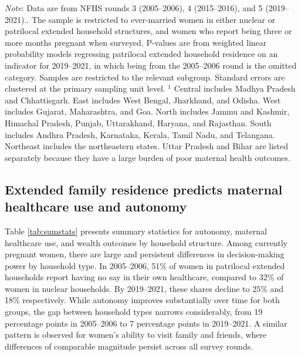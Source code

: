 \documentclass[10pt,twoside,reqno]{article}
\begin{document}
\begin{table}[H]
\sansmath
\sffamily
\captionsetup{style=CAPFIG}
\caption{Proportion of pregnant women in patrilocal extended households is increasing among nearly all subgroups}
\label{tab:patrilocal_subgroups}
\vspace{-4pt}

\begin{scriptsize}
\setlength{\tabcolsep}{6pt}
\renewcommand{\arraystretch}{1.2}
\centering

\end{scriptsize}

\vspace{1ex}
\small\scriptsize{\textsf{\textit{Note}: Data are from NFHS rounds 3 (2005--2006), 4 (2015--2016), and 5 (2019--2021)..}} 
\small\scriptsize{\textsf{The sample is restricted to ever-married women in either nuclear or patrilocal extended household structures, and women who report being three or more months pregnant when surveyed.}}
\newline\small\scriptsize{P-values are from weighted linear probability models regressing patrilocal extended household residence on an indicator for 2019--2021, in which being from the 2005--2006 round is the omitted category.  Samples are restricted to the relevant subgroup. Standard errors are clustered at the primary sampling unit level.}
\newline \small\scriptsize{\textsf{$^1$ Central includes Madhya Pradesh and Chhattisgarh. East includes West Bengal, Jharkhand, and Odisha. West includes Gujarat, Maharashtra, and Goa. North includes Jammu and Kashmir, Himachal Pradesh, Punjab, Uttarakhand, Haryana, and Rajasthan. South includes Andhra Pradesh, Karnataka, Kerala, Tamil Nadu, and Telangana. Northeast includes the northeastern states. Uttar Pradesh and Bihar are listed separately because they have a large burden of poor maternal health outcomes.}}
\end{table}

\subsection{Extended family residence predicts maternal healthcare use and autonomy}

Table \ref{tab:sumstats} presents summary statistics for autonomy, maternal healthcare use, and wealth outcomes by household structure. Among currently pregnant women, there are large and persistent differences in decision-making power by household type. In 2005–2006, 51\% of women in patrilocal extended households report having no say in their own healthcare, compared to 32\% of women in nuclear households. By 2019–2021, these shares decline to 25\% and 18\% respectively. While autonomy improves substantially over time for both groups, the gap between household types narrows considerably, from 19 percentage points in 2005–2006 to 7 percentage points in 2019–2021. A similar pattern is observed for women’s ability to visit family and friends, where differences of comparable magnitude persist across all survey rounds.
\end{document}
